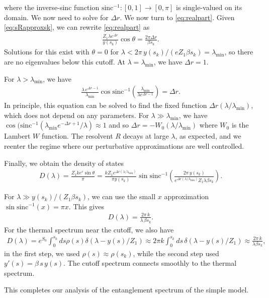 \documentclass[11pt]{article}
\newcommand{\smax}{s_k}
\numberwithin{equation}{section}
\begin{document}
where the inverse-sinc function $\text{sinc}^{-1}: [0,1] \to [0,\pi]$ is single-valued on its domain. We now need to solve for $\Delta r$. We now turn to \eqref{eq:realpart}. Given \eqref{eq:sRapproxsk}, we can rewrite \eqref{eq:realpart} as
\begin{align}
\frac{Z_1 \lambda  e^{ \Delta r}}{y(\smax)} \cos \theta = \frac{2\pi \Delta r}{\beta \smax}.
\end{align}
Solutions for this exist with $\theta = 0$ for $\lambda < 2 \pi\, y(\smax)/ (e Z_1 \beta \smax) = \lambda_\text{min}$, so there are no eigenvalues below this cutoff. At $\lambda = \lambda_\text{min}$, we have $\Delta r = 1$. 

For $\lambda > \lambda_\text{min}$, we have
\begin{align}
\frac{ \lambda\,  e^{ \Delta r - 1}}{\lambda_\text{min}} \cos\text{sinc}^{-1}\left(\frac{\lambda_\text{min}}{ \lambda e^{\Delta r - 1}} \right) = \Delta r.
\end{align}
In principle, this equation can be solved to find the fixed function $\Delta r(\lambda/\lambda_\text{min})$, which does not depend on any parameters. For $\lambda \gg \lambda_\text{min}$, we have $ \cos(\text{sinc}^{-1}\left(\lambda_\text{min}e^{-\Delta r + 1}/ \lambda  \right) \approx 1$ and so $\Delta r = - W_0(\lambda/\lambda_\text{min})$ where $W_0$ is the Lambert $W$ function. The resolvent $R$ decays at large $\lambda$, as expected, and we reenter the regime where our perturbative approximations are well controlled.

Finally, we obtain the density of states
\begin{align} \label{eq:sinsinc}
D(\lambda) = \frac{Z_1 k e^r \sin \theta}{\pi} =  \frac{k Z_1 e^{\Delta r(\lambda/\lambda_\text{min})}}{\pi y(\smax)} \sin \text{sinc}^{-1}\left(\frac{2\pi \, y(\smax) }{e^{\Delta r(\lambda/\lambda_\text{min})} Z_1 \lambda \beta \smax} \right).
\end{align}

For $\lambda \gg y(\smax)/( Z_1 \beta \smax)$, we can use the small $x$ approximation $\sin \text{sinc}^{-1}(x) = \pi x$. This gives
\begin{align}
D(\lambda) = \frac{2 \pi \,k }{ \lambda\, \beta \smax}.
\end{align}
For the thermal spectrum near the cutoff, we also have
\begin{align}
D(\lambda) = e^{S_0} \int_0^{\smax} ds \rho(s) \delta(\lambda - y(s)/Z_1) \approx 2 \pi k \int_0^{\smax} ds  \,\delta(\lambda - y(s)/Z_1) \approx \frac{2 \pi \,k}{\lambda \beta \smax },
\end{align}
in the first step, we used $\rho(s) \approx \rho(\smax)$, while the second step used $y'(s) = \beta\, s\, y(s)$. The cutoff spectrum connects smoothly to the thermal spectrum. 

This completes our analysis of the entanglement spectrum of the simple model.


{\footnotesize

}


\end{document}
